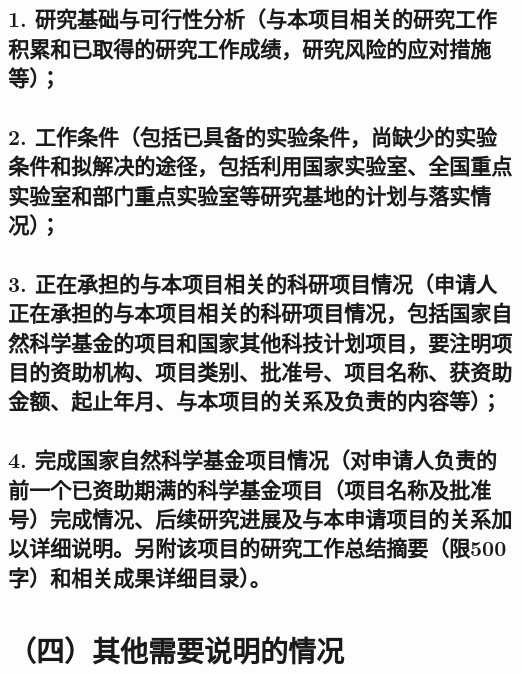 \documentclass[12pt,UTF8,AutoFakeBold=2.5,a4paper,fontset=none]{ctexart} %
\begin{document}
{\subsection{1. \textbf{研究基础与可行性分析}（与本项目相关的研究工作积累和已\linebreak{}取得的研究工作成绩，研究风险的应对措施等）；}}

\setcounter{subsection}{3} %



\subsection{{2. \textbf{工作条件}（包括已具备的实验条件，尚缺少的实验条件和拟\linebreak{}解决的途径，包括利用国家实验室、全国重点实验室和部门重点实验\linebreak{}室等研究基地的计划与落实情况）；}}



\subsection{{3. \textbf{正在承担的与本项目相关的科研项目情况}（申请人正在承担\linebreak{}的与本项目相关的科研项目情况，包括国家自然科学基金的项目和国\linebreak{}家其他科技计划项目，要注明项目的资助机构、项目类别、批准号、\linebreak{}项目名称、获资助金额、起止年月、与本项目的关系及负责的内容等）；}}



\subsection{{4. \textbf{完成国家自然科学基金项目情况}（对申请人负责的前一个已\linebreak{}资助期满的科学基金项目（项目名称及批准号）完成情况、后续研究\linebreak{}进展及与本申请项目的关系加以详细说明。另附该项目的研究工作总\linebreak{}结摘要（限500字）和相关成果详细目录）。}}



\section{（四）其他需要说明的情况}
\end{document}
